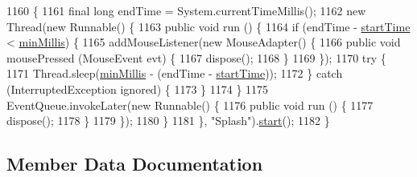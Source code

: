 \begin{DoxyCode}
1160                              \{
1161             \textcolor{keyword}{final} \textcolor{keywordtype}{long} endTime = System.currentTimeMillis();
1162             \textcolor{keyword}{new} Thread(\textcolor{keyword}{new} Runnable() \{
1163                 \textcolor{keyword}{public} \textcolor{keywordtype}{void} run () \{
1164                     \textcolor{keywordflow}{if} (endTime - \mbox{\hyperlink{classorg_1_1newdawn_1_1slick_1_1tools_1_1hiero_1_1_hiero_1_1_splash_a455ff850b006e49cfa0cfeb29cdcd022}{startTime}} < \mbox{\hyperlink{classorg_1_1newdawn_1_1slick_1_1tools_1_1hiero_1_1_hiero_1_1_splash_a4a6f03856af4186e89f91fc54d722ca7}{minMillis}}) \{
1165                         addMouseListener(\textcolor{keyword}{new} MouseAdapter() \{
1166                             \textcolor{keyword}{public} \textcolor{keywordtype}{void} mousePressed (MouseEvent evt) \{
1167                                 dispose();
1168                             \}
1169                         \});
1170                         \textcolor{keywordflow}{try} \{
1171                             Thread.sleep(\mbox{\hyperlink{classorg_1_1newdawn_1_1slick_1_1tools_1_1hiero_1_1_hiero_1_1_splash_a4a6f03856af4186e89f91fc54d722ca7}{minMillis}} - (endTime - 
      \mbox{\hyperlink{classorg_1_1newdawn_1_1slick_1_1tools_1_1hiero_1_1_hiero_1_1_splash_a455ff850b006e49cfa0cfeb29cdcd022}{startTime}}));
1172                         \} \textcolor{keywordflow}{catch} (InterruptedException ignored) \{
1173                         \}
1174                     \}
1175                     EventQueue.invokeLater(\textcolor{keyword}{new} Runnable() \{
1176                         \textcolor{keyword}{public} \textcolor{keywordtype}{void} run () \{
1177                             dispose();
1178                         \}
1179                     \});
1180                 \}
1181             \}, \textcolor{stringliteral}{"Splash"}).\mbox{\hyperlink{namespaceejemplo_1_1clase_abcf43191f0ecf3b071ca2db7696ba821}{start}}();
1182         \}
\end{DoxyCode}


\subsection{Member Data Documentation}
\mbox{\label{classorg_1_1newdawn_1_1slick_1_1tools_1_1hiero_1_1_hiero_1_1_splash_a4a6f03856af4186e89f91fc54d722ca7}} 
